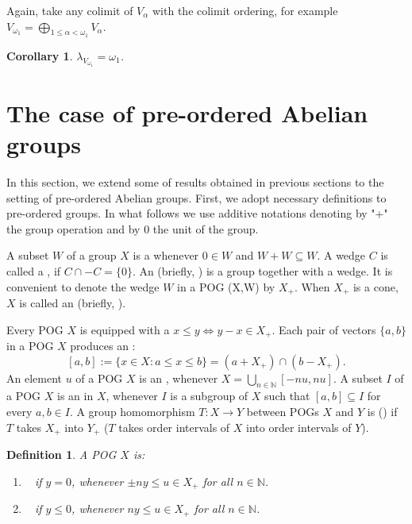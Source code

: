 \documentclass[10pt]{article}
\newtheorem{corollary}{Corollary}[section]
\newtheorem{definition}{Definition}[section]
\renewcommand{\a}{\alpha}
\newcommand{\w}{\omega}
\begin{document}
\noindent
Again, take any colimit of $ V_\a $ with the colimit ordering, for example $V_{\w_1} = \bigoplus_{1 \leqslant \a < \w_1} V_\a$.

\begin{corollary}\label{Corollary-4_2}
$\lambda_{V_{\w_1}} = \w_1 $.
\end{corollary}


\section{The case of pre-ordered Abelian groups}

\hspace{4mm}
In this section, we extend some of results obtained in previous sections to the setting of pre-ordered Abelian groups.
First, we adopt necessary definitions to pre-ordered groups. In what follows we use additive notations denoting by "+"
the group operation and by 0 the unit of the group.

A subset $W$ of a group $X$ is a {\color{blue}{wedge}} whenever $0\in W$ and $W+W\subseteq W$. 
A wedge $C$ is called a {\color{blue}{cone}}, if $C\cap-C=\{0\}$. 
An {\color{blue}{pre-ordered group}} (briefly, {\color{blue}{POG}}) is a group together with a wedge. 
It is convenient to denote the wedge $W$ in a POG (X,W) by $X_+$.
When $X_+$ is a cone, $X$ is called an {\color{blue}{ordered group}} (briefly, {\color{blue}{OG}}).

Every POG $X$ is equipped with a {\color{blue}{partial pre-order}} $x\leqslant y \iff y-x\in X_+$. 
Each pair of vectors $\{a,b\}$ in a POG $X$ produces an {\color{blue}{order interval}}:
$$
   [a,b]:=\{x\in X: a\leqslant x\leqslant b\}=(a+X_+)\cap(b-X_+).
$$
An element $u$ of a POG $X$ is an {\color{blue}{order unit}}, whenever $X=\bigcup\limits_{n\in\mathbb{N}}[-nu,nu]$.
A subset $I$ of a POG $X$ is an {\color{blue}{order ideal}} in $X$, whenever $I$ is a subgroup of $X$ such that $[a,b]\subseteq I$ for every $a,b\in I$.
A group homomorphism $T: X\to Y$ between POGs $X$ and $Y$ is {\color{blue}{positive}} ({\color{blue}{order bounded}}) if $T$ takes $X_+$ into $Y_+$
($T$ takes order intervals of $X$ into order intervals of $Y$).

\begin{definition}\label{Definition-5_1}
A POG $X$ is:
\begin{enumerate}[-]
\item\
{\color{blue}{almost Archimedean}} if $y=0$, whenever $\pm ny\leqslant u\in X_+$ for all $n\in\mathbb{N}$.
\item\
{\color{blue}{Archimedean}} if $y\leqslant 0$, whenever $ny\leqslant u\in X_+$ for all $n\in\mathbb{N}$.
\end{enumerate}
\end{definition}
\end{document}
